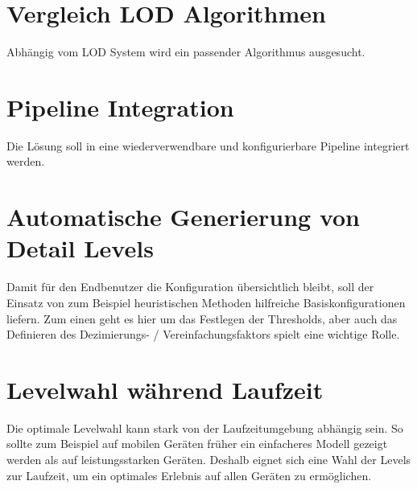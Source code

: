 \section{Vergleich LOD Algorithmen}
Abhängig vom LOD System wird ein passender Algorithmus ausgesucht.

\section{Pipeline Integration}
Die Lösung soll in eine wiederverwendbare und konfigurierbare Pipeline integriert werden.

\section{Automatische Generierung von Detail Levels}
Damit für den Endbenutzer die Konfiguration übersichtlich bleibt, soll der Einsatz von zum Beispiel heuristischen Methoden hilfreiche Basiskonfigurationen liefern.
Zum einen geht es hier um das Festlegen der Thresholds, aber auch das Definieren des Dezimierungs- / Vereinfachungsfaktors spielt eine wichtige Rolle.

\section{Levelwahl während Laufzeit}
Die optimale Levelwahl kann stark von der Laufzeitumgebung abhängig sein. So sollte zum Beispiel auf mobilen Geräten früher ein einfacheres Modell gezeigt werden als auf leistungsstarken Geräten.
Deshalb eignet sich eine Wahl der Levels zur Laufzeit, um ein optimales Erlebnis auf allen Geräten zu ermöglichen.
